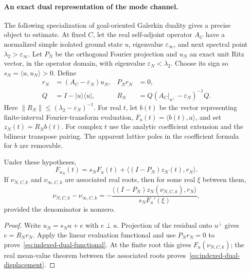 \paragraph{An exact dual representation of the mode channel.}
The following specialization of goal-oriented Galerkin duality
\cite{IndexedBeckerRannacher} gives a precise object to estimate. At fixed
$C$, let the real self-adjoint operator $A_C$ have a normalized simple
isolated ground state $u$, eigenvalue $\varepsilon_\infty$, and next
spectral point $\lambda_2>\varepsilon_\infty$. Let $P_N$ be the orthogonal
Fourier projection and $u_N$ an exact unit Ritz vector, in the operator
domain, with eigenvalue $\varepsilon_N<\lambda_2$. Choose its sign so
$s_N=\langle u,u_N\rangle>0$. Define
\begin{align*}
 r_N&=(A_C-\varepsilon_N)u_N, &P_Nr_N&=0,\\
 Q&=I-|u\rangle\langle u|,
 &R_N&=Q(A_C|_{u^\perp}-\varepsilon_N)^{-1}Q.
\end{align*}
Here $\|R_N\|\le(\lambda_2-\varepsilon_N)^{-1}$. For real $t$, let
$b(t)$ be the vector representing finite-interval Fourier-transform
evaluation, $F_a(t)=\langle b(t),a\rangle$, and set $z_N(t)=R_Nb(t)$.
For complex $t$ use the analytic coefficient extension and the bilinear
transpose pairing. The apparent lattice poles in the coefficient formula
for $b$ are removable.

\begin{proposition}
\label{prop:indexed-dual-mode}
Under these hypotheses,
\begin{equation}\label{eq:indexed-dual-functional}
 F_{u_N}(t)=s_NF_u(t)
       +\langle (I-P_N)z_N(t),r_N\rangle.
\end{equation}
If $\nu_{N,C,k}$ and $\nu_{\infty,C,k}$ are associated real roots, then
for some real $\xi$ between them,
\begin{equation}\label{eq:indexed-dual-displacement}
 \nu_{N,C,k}-\nu_{\infty,C,k}
 =-\frac{\langle(I-P_N)z_N(\nu_{N,C,k}),r_N\rangle}
              {s_NF_u'(\xi)},
\end{equation}
provided the denominator is nonzero.
\end{proposition}
\begin{proof}
Write $u_N=s_Nu+e$ with $e\perp u$. Projection of the residual onto
$u^\perp$ gives $e=R_Nr_N$. Apply the linear evaluation functional and
use $P_Nr_N=0$ to prove~\eqref{eq:indexed-dual-functional}. At the finite
root this gives $F_u(\nu_{N,C,k})$; the real mean-value theorem between
the associated roots proves~\eqref{eq:indexed-dual-displacement}.
\end{proof}

